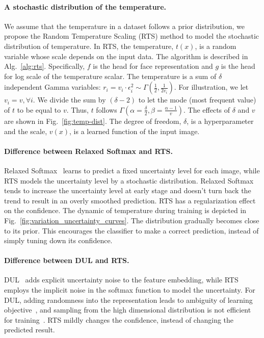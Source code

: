 \documentclass[letterpaper]{article} %
\begin{document}
\paragraph{A stochastic distribution of the temperature.}
We assume that the temperature in a dataset follows a prior distribution, we propose the Random Temperature Scaling (RTS) method to model the stochastic distribution of temperature. In RTS, the temperature, $t(x)$, is a random variable whose scale depends on the input data.
The algorithm is described in Alg.~\ref{alg:rts}. Specifically, $f$ is the head for face representation and $g$ is the head for log scale of the temperature scalar.
The temperature is a sum of $\delta$ independent Gamma variables: $r_i = v_i \cdot \epsilon_i^2 \sim \Gamma(\frac{1}{2}, \frac{1}{2v_i})$. For illustration, we let $v_i = v, \forall i$. We divide the sum by $(\delta - 2)$ to let the mode (most frequent value) of $t$ to be equal to $v$. Thus, $t$ follows $\Gamma(\alpha = \frac{\delta}{2}, \beta = \frac{\alpha - 1}{v})$. The effects of $\delta$ and $v$ are shown in Fig.~\ref{fig:temp-dist}.
The degree of freedom, $\delta$, is a hyperparameter and the scale, $v(x)$, is a learned function of the input image.



\paragraph{Difference between Relaxed Softmax and RTS.}
Relaxed Softmax~\cite{techapanurak2019hyperparameter,neumann18relaxed} learns to predict a fixed uncertainty level for each image, while RTS models the uncertainty level by a stochastic distribution.
Relaxed Softmax tends to increase the uncertainty level at early stage and doesn't turn back the trend to result in an overly smoothed prediction. %
RTS has a regularization effect on the confidence. The dynamic of temperature during training is depicted in Fig.~\ref{fig:variation_uncertainty_curves}.
The distribution gradually becomes close to its prior. This encourages the classifier to make a correct prediction, instead of simply tuning down its confidence.


\paragraph{Difference between DUL and RTS.}
DUL~\cite{chang2020data} adds explicit uncertainty noise to the feature embedding, while RTS employs the implicit noise in the softmax function to model the uncertainty.
For DUL, adding randomness into the representation leads to ambiguity of learning objective~\cite{tolstikhin2018wasserstein}, and sampling from the high dimensional distribution is not efficient for training~\cite{kingma2014auto}. RTS mildly changes the confidence, instead of changing the predicted result.
\end{document}
